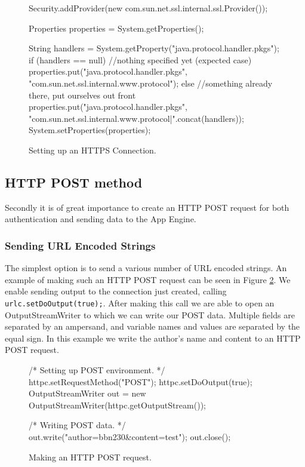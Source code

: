 \begin{figure}[ht] %
\begin{center}
\begin{code}
Security.addProvider(new com.sun.net.ssl.internal.ssl.Provider());

Properties properties = System.getProperties();

String handlers = System.getProperty("java.protocol.handler.pkgs");
if (handlers == null) { //nothing specified yet (expected case)
    properties.put("java.protocol.handler.pkgs",
        "com.sun.net.ssl.internal.www.protocol");
} 
else { //something already there, put ourselves out front
    properties.put("java.protocol.handler.pkgs",
        "com.sun.net.ssl.internal.www.protocol|".concat(handlers));
}
System.setProperties(properties);
\end{code}
\caption{Setting up an HTTPS Connection.\label{clientimpl-https}}
\end{center}
\end{figure}

\subsection{HTTP POST method}
Secondly it is of great importance to create an HTTP POST request for both
authentication and sending data to the App Engine.

\subsubsection{Sending URL Encoded Strings}
The simplest option is to send a various number of URL encoded strings. An
example of making such an HTTP POST request can be seen in Figure
\ref{clientimpl-post}. We enable sending output to the connection just created,
calling \texttt{urlc.setDoOutput(true);}. After making this call we are able to
open an OutputStreamWriter to which we can write our POST data. Multiple fields are
separated by an ampersand, and variable names and values are separated by the
equal sign. In this example we write the author's name and content to an HTTP
POST request.

\begin{figure}[ht] %
\begin{center}
\begin{code}
/* Setting up POST environment. */
httpc.setRequestMethod("POST");
httpc.setDoOutput(true);
OutputStreamWriter out = new OutputStreamWriter(httpc.getOutputStream());

/* Writing POST data. */
out.write("author=bbn230&content=test");
out.close();
\end{code}
\caption{Making an HTTP POST request.\label{clientimpl-post}}
\end{center}
\end{figure}

